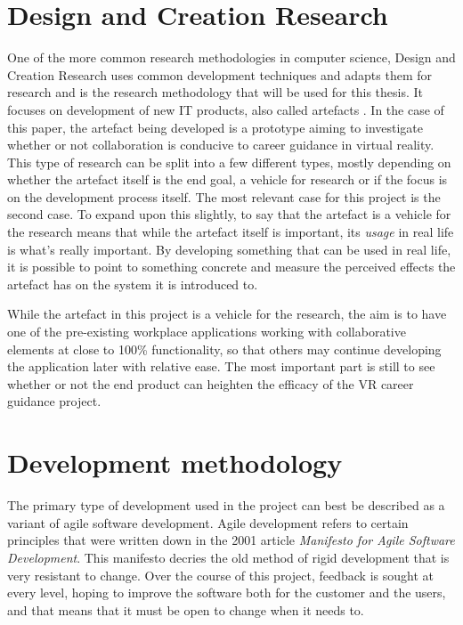 \section{Design and Creation Research}
\label{sec:designCreationResearch}
One of the more common research methodologies in computer science, Design and Creation Research uses common development techniques and adapts them for research and is the research methodology that will be used for this thesis. It focuses on development of new IT products, also called artefacts \cite{oates2005researching}. In the case of this paper, the artefact being developed is a prototype aiming to investigate whether or not collaboration is conducive to career guidance in virtual reality. This type of research can be split into a few different types, mostly depending on whether the artefact itself is the end goal, a vehicle for research or if the focus is on the development process itself. The most relevant case for this project is the second case. To expand upon this slightly, to say that the artefact is a vehicle for the research means that while the artefact itself is important, its \textit{usage} in real life is what's really important. By developing something that can be used in real life, it is possible to point to something concrete and measure the perceived effects the artefact has on the system it is introduced to.

While the artefact in this project is a vehicle for the research, the aim is to have one of the pre-existing workplace applications working with collaborative elements at close to 100\% functionality, so that others may continue developing the application later with relative ease. The most important part is still to see whether or not the end product can heighten the efficacy of the VR career guidance project.


\section{Development methodology}
The primary type of development used in the project can best be described as a variant of agile software development. Agile development refers to certain principles that were written down in the 2001 article \textit{Manifesto for Agile Software Development}\cite{beck2001manifesto}. This manifesto decries the old method of rigid development that is very resistant to change. Over the course of this project, feedback is sought at every level, hoping to improve the software both for the customer and the users, and that means that it must be open to change when it needs to.

